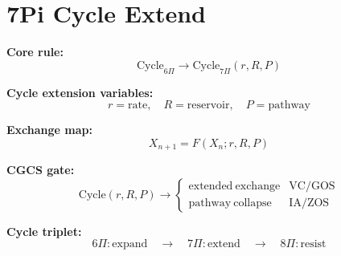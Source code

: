 \section*{7Pi Cycle Extend}

\textbf{Core rule:}
\[
\mathrm{Cycle}_{6\Pi}
\rightarrow
\mathrm{Cycle}_{7\Pi}(r,R,P)
\]

\textbf{Cycle extension variables:}
\[
r = \mathrm{rate}, \quad R = \mathrm{reservoir}, \quad P = \mathrm{pathway}
\]

\textbf{Exchange map:}
\[
X_{n+1} = F(X_n; r,R,P)
\]

\textbf{CGCS gate:}
\[
\mathrm{Cycle}(r,R,P) \rightarrow
\begin{cases}
\mathrm{extended\ exchange} & \text{VC/GOS} \\
\mathrm{pathway\ collapse} & \text{IA/ZOS}
\end{cases}
\]

\textbf{Cycle triplet:}
\[
6\Pi:\mathrm{expand}
\quad\rightarrow\quad
7\Pi:\mathrm{extend}
\quad\rightarrow\quad
8\Pi:\mathrm{resist}
\]

